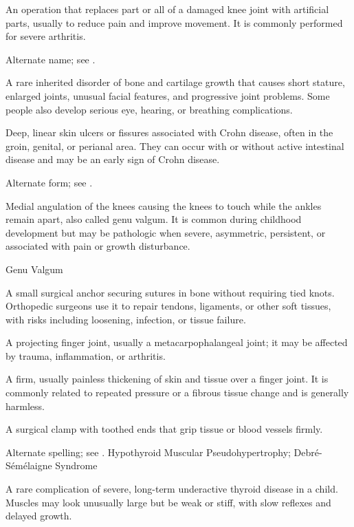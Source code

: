  An operation that replaces part or all of a damaged knee joint with artificial parts, usually to reduce pain and improve movement. It is commonly performed for severe arthritis.

 Alternate name; see .

 A rare inherited disorder of bone and cartilage growth that causes short stature, enlarged joints, unusual facial features, and progressive joint problems. Some people also develop serious eye, hearing, or breathing complications.

 Deep, linear skin ulcers or fissures associated with Crohn disease, often in the groin, genital, or perianal area. They can occur with or without active intestinal disease and may be an early sign of Crohn disease.

 Alternate form; see .

 Medial angulation of the knees causing the knees to touch while the ankles remain apart,
also called genu valgum. It is common during childhood development but may be pathologic
when severe, asymmetric, persistent, or associated with pain or growth disturbance.

\synonyms
Genu Valgum

 A small surgical anchor securing sutures in bone without requiring tied knots. Orthopedic surgeons use it to repair tendons, ligaments, or other soft tissues, with risks including loosening, infection, or tissue failure.

 A projecting finger joint, usually a metacarpophalangeal joint; it may be affected by trauma, inflammation, or arthritis.

 A firm, usually painless thickening of skin and tissue over a finger joint. It is commonly related to repeated pressure or a fibrous tissue change and is generally harmless.

 A surgical clamp with toothed ends that grip tissue or blood vessels firmly.

 Alternate spelling; see .
\synonyms
Hypothyroid Muscular Pseudohypertrophy; Debré-Sémélaigne Syndrome

 A rare complication of severe, long-term underactive thyroid disease in a child. Muscles may look unusually large but be weak or stiff, with slow reflexes and delayed growth.

